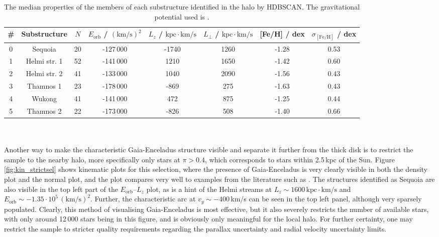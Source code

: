 \documentclass[a4paper,11pt]{article}
\begin{document}
%
\begin{table}
\centering\small
\caption[Properties of identified substructures in halo]{The median properties of the members of each substructure identified in the halo by \textsc{HDBSCAN}. The gravitational potential used is \citet{mcmillan17}.}
\label{tab:substructures}
\begin{tabular}{|c|c||c|c|c|c|c|c|}
  \hline
  \# & Substructure & $N$ & $E_\mathrm{orb}$ / $\mathrm{(km/s)}^2$ & $L_z$ / $\mathrm{kpc}{\cdot}\mathrm{km/s}$ & $L_\perp$ / $\mathrm{kpc}{\cdot}\mathrm{km/s}$  & [Fe/H] / dex & $\sigma_\mathrm{[Fe/H]}$ / dex \\
  \hline\hline
  0 & Sequoia & 20 & -127\,000 & -1740 & 1260 & -1.28 & 0.53 \\
  \hline
  1 & Helmi str. 1 & 52 & -141\,000 & 1210 & 1650 & -1.42 & 0.60 \\
  \hline
  2 & Helmi str. 2 & 41 & -133\,000 & 1040 & 2090 & -1.56 & 0.43 \\
  \hline
  3 & Thamnos 1 & 23 & -178\,000 & -869 & 275 & -1.63 & 0.43 \\
  \hline
  4 & Wukong & 41 & -141\,000 & 472 & 875 & -1.25 & 0.44 \\
  \hline
  5 & Thamnos 2 & 22 & -173\,000 & -826 & 508 & -1.40 & 0.66 \\
  \hline
\end{tabular}
\end{table}\\ \\
%
Another way to make the characteristic Gaia-Enceladus structure visible and separate it further from the thick disk is to restrict the sample to the nearby halo, more specifically only stars at $\pi>0.4$, which corresponds to stars within 2.5\,kpc of the Sun. Figure \ref{fig:kin_strictsel} shows kinematic plots for this selection, where the presence of Gaia-Enceladus is very clearly visible in both the density plot and the normal plot, and the plot compares very well to examples from the literature such as \citet{helmi18,lovdal22,koppelman18}. The structures identified as Sequoia are also visible in the top left part of the $E_\mathrm{orb}$--$L_z$ plot, as is a hint of the Helmi streams at $L_z\sim1600\,\mathrm{kpc}{\cdot}\mathrm{km/s}$ and $E_\mathrm{orb}\sim-1.35\cdot10^5\,\mathrm{(km/s)}^2$. Further, the characteristic arc at $v_y\sim-400$\,km/s can be seen in the top left panel, although very sparsely populated. Clearly, this method of visualising Gaia-Enceladus is most effective, but it also severely restricts the number of available stars, with only around 12\,000 stars being in this figure, and is obviously only meaningful for the local halo. For further certainty, one may restrict the sample to stricter quality requirements regarding the parallax uncertainty and radial velocity uncertainty limits.\\ \\
\end{document}
